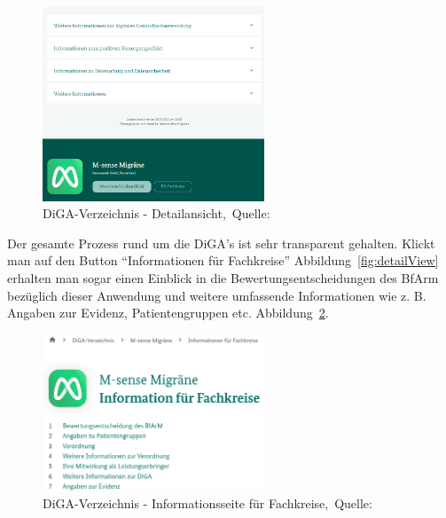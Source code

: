 \begin{figure}[H]
	\centering
	\includegraphics[width=250px]{assets/digaBSP3.png}
	\caption[DiGA-Verzeichnis - Detailansicht]{DiGA-Verzeichnis - Detailansicht,~Quelle:~\cite{digadetailansicht}}
	\label{fig:foot}
\end{figure}

Der gesamte Prozess rund um die DiGA's ist sehr transparent gehalten. Klickt man auf den Button ``Informationen für Fachkreise'' Abbildung~\ref{fig:detailView} erhalten man sogar einen Einblick in die Bewertungsentscheidungen des BfArm bezüglich dieser Anwendung und weitere umfassende Informationen wie z. B. Angaben zur Evidenz, Patientengruppen etc. Abbildung~\ref{fig:moreInfo}.
\begin{figure}[H]
	\centering
	\includegraphics[width=250px, keepaspectratio]{assets/digaBSP4.png}
	\caption[DiGA-Verzeichnis - Informationsseite für Fachkreise]{DiGA-Verzeichnis - Informationsseite für Fachkreise,~Quelle:~\cite{digafachkreise}}
	\label{fig:moreInfo}
\end{figure}
